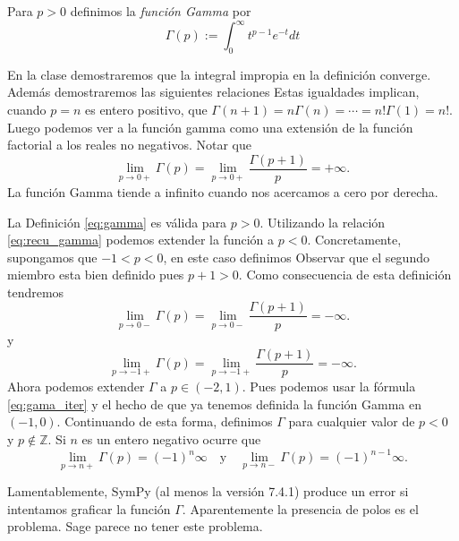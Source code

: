 \documentclass{article}
\begin{document}
\begin{definicion}\label{def:gamma} Para $p>0$ definimos la \emph{función Gamma} por 
\begin{equation}\label{eq:gamma}\Gamma(p):=\int_0^{\infty}t^{p-1}e^{-t}dt
\end{equation}
\end{definicion}

En la clase demostraremos que la integral impropia en la definición converge. Además demostraremos las siguientes relaciones
Estas igualdades  implican, cuando $p=n$ es entero positivo, que $\Gamma(n+1)=n\Gamma(n)=\cdots=n!\Gamma(1)=n!$. Luego podemos ver a la función gamma como una extensión de la función factorial a los reales no negativos. Notar que
\[\lim_{p\to 0+}\Gamma(p)=\lim_{p\to 0+}\frac{\Gamma(p+1)}{p}=+\infty.\]
La función Gamma tiende a  infinito cuando nos acercamos a cero por derecha.

La Definición \ref{eq:gamma} es válida para $p>0$. Utilizando la relación \eqref{eq:recu_gamma} podemos extender la función a $p<0$. Concretamente,  supongamos  que $-1<p<0$, en  este caso definimos
Observar que el segundo miembro esta bien definido pues $p+1>0$. Como consecuencia de esta definición tendremos
\[\lim_{p\to 0-}\Gamma(p)=\lim_{p\to 0-}\frac{\Gamma(p+1)}{p}=-\infty.\]
y 
\[\lim_{p\to -1+}\Gamma(p)=\lim_{p\to -1+}\frac{\Gamma(p+1)}{p}=-\infty.\] 
Ahora podemos extender $\Gamma$ a $p\in (-2,1)$. Pues  podemos usar la fórmula \eqref{eq:gama_iter} y el hecho de que ya tenemos definida la función Gamma en $(-1,0)$. Continuando de esta forma, definimos $\Gamma$ para cualquier valor de $p<0$ y $p\notin \mathbb{Z}$. Si $n$ es un entero negativo ocurre que
\[\lim_{p\to n+}\Gamma(p)=(-1)^n\infty\quad\text{y}\quad \lim_{p\to n-}\Gamma(p)=(-1)^{n-1}\infty.\] 



Lamentablemente, SymPy (al menos la versión 7.4.1) produce un error si intentamos graficar la función $\Gamma$. Aparentemente la presencia de polos es el problema. Sage parece no tener este problema. 


\end{document}
